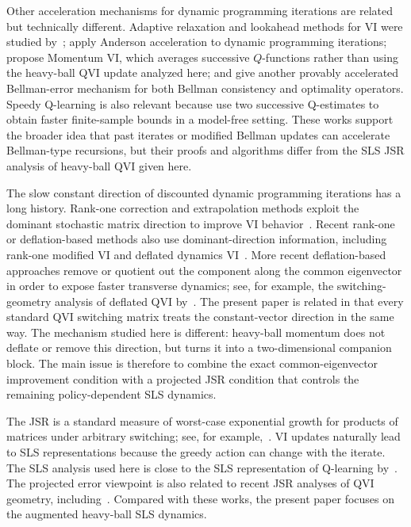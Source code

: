 \documentclass[letterpaper]{article}
\numberwithin{equation}{section}
\begin{document}
Other acceleration mechanisms for dynamic programming iterations are related but technically different. Adaptive relaxation and lookahead methods for VI were studied by~\citet{herzberg1994accelerating,shlakhter2010acceleration}; \citet{geist2018anderson} apply Anderson acceleration to dynamic programming iterations; \citet{vieillard2020momentum} propose Momentum VI, which averages successive $Q$-functions rather than using the heavy-ball QVI update analyzed here; and \citet{lee2023anchoring} give another provably accelerated Bellman-error mechanism for both Bellman consistency and optimality operators. Speedy Q-learning is also relevant because \citet{azar2011speedy} use two successive Q-estimates to obtain faster finite-sample bounds in a model-free setting. These works support the broader idea that past iterates or modified Bellman updates can accelerate Bellman-type recursions, but their proofs and algorithms differ from the SLS JSR analysis of heavy-ball QVI given here.


The slow constant direction of discounted dynamic programming iterations has a
long history. Rank-one correction and extrapolation methods exploit the dominant
stochastic matrix direction to improve VI behavior~\citep{bertsekas1995rankone}. Recent rank-one or deflation-based methods also use dominant-direction information, including rank-one modified VI and deflated dynamics VI~\citep{kolarijani2025rankone,lee2025deflateddynamics}. More recent deflation-based approaches remove or quotient out the component along the common eigenvector in order to expose faster
transverse dynamics; see, for example, the switching-geometry analysis of
deflated QVI by~\citet{lee2026deflated}. The present paper is
related in that every standard QVI switching matrix treats the constant-vector
direction in the same way. The mechanism studied here is different: heavy-ball momentum does not deflate or
remove this direction, but turns it into a two-dimensional companion block. The
main issue is therefore to combine the exact common-eigenvector improvement condition
with a projected JSR condition that controls the remaining policy-dependent
SLS dynamics.


The JSR is a standard measure of worst-case exponential growth for products of
matrices under arbitrary switching; see, for example,~\citep{jungers2009joint}. VI updates naturally lead to SLS representations because the greedy action
can change with the iterate. The SLS analysis used here is close to the SLS representation of Q-learning by~\citet{lee2026lyapunovcertified}. The projected error viewpoint is also related to recent
JSR analyses of QVI geometry, including~\citet{lee2026geometry,lee2026deflated}. Compared with these works, the present paper
focuses on the augmented heavy-ball SLS dynamics.
\end{document}

